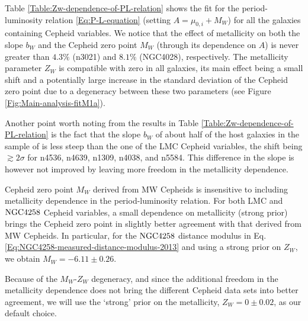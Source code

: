 Table \ref{Table:Zw-dependence-of-PL-relation} shows the fit for the period-luminosity relation \eqref{Eq:P-L-equation}  (setting $A=\mu_{0,i} + M_W$) for all the galaxies containing Cepheid variables. We notice that the effect of metallicity on both the slope $b_W$ and the Cepheid zero point $M_W$ (through its dependence on $A$) is never greater than $4.3\%$ (n3021) and $8.1\%$ (NGC4028), respectively. The metallicity parameter $Z_W$ is compatible with zero in all galaxies, its main effect being a small shift and a potentially large increase in the standard deviation of the Cepheid zero point due to a degeneracy between these two parameters (see Figure \ref{Fig:Main-analysis-fitM1a}). 

Another point worth noting from the results in Table \ref{Table:Zw-dependence-of-PL-relation} is the fact that the slope $b_W$ of about half of the host galaxies in the sample of \cite{Riess:2011yx} is less steep than the one of the LMC Cepheid variables, the shift being $\gtrsim 2\sigma$ for n4536, n4639, n1309, n4038, and n5584. This difference in the slope is however not improved by leaving more freedom in the metallicity dependence.

Cepheid zero point $M_W$ derived from MW Cepheids is insensitive to including metallicity dependence in the period-luminosity relation. For both LMC and $\mathrm{NGC4258}$ Cepheid variables, a small dependence on metallicity (strong prior) brings the Cepheid zero point in slightly better agreement with that derived from MW Cepheids. In particular, for the $\mathrm{NGC4258}$ distance modulus in Eq. \eqref{Eq:NGC4258-measured-distance-modulus-2013} and using a strong prior on $Z_W$, we obtain $M_W=-6.11 \pm 0.26$.

Because of the $M_W$-$Z_W$ degeneracy, and since the additional freedom in the metallicity dependence does not bring the different Cepheid data sets into better agreement,
we will use the `strong' prior on the metallicity, $Z_W = 0 \pm 0.02$, as our default choice.

